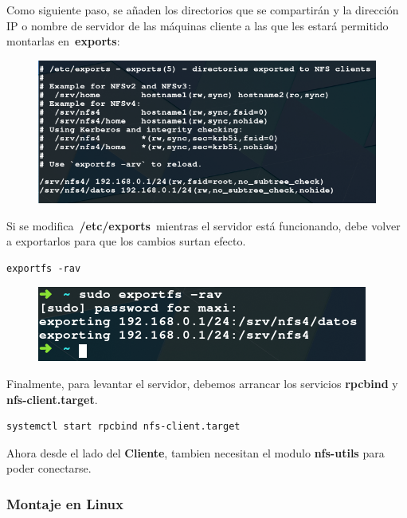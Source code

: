 \documentclass[12pt]{extarticle}
\begin{document}
Como siguiente paso, se añaden los directorios que se compartirán y la
dirección IP o nombre de servidor de las máquinas cliente a las que les
estará permitido montarlas en~\textbf{exports}:

\begin{figure}
\centering
\includegraphics{images/exports.png}
\caption{}
\end{figure}

Si se modifica~\textbf{/etc/exports}~mientras el servidor está
funcionando, debe volver a exportarlos para que los cambios surtan
efecto.

\begin{verbatim}
exportfs -rav
\end{verbatim}

\begin{figure}
\centering
\includegraphics{images/exportfs.png}
\caption{}
\end{figure}

Finalmente, para levantar el servidor, debemos arrancar los servicios
\textbf{rpcbind} y \textbf{nfs-client.target}.

\begin{verbatim}
systemctl start rpcbind nfs-client.target
\end{verbatim}

Ahora desde el lado del \textbf{Cliente}, tambien necesitan el modulo
\textbf{nfs-utils} para poder conectarse.

\subsubsection{Montaje en Linux}\label{montaje-en-linux}
\end{document}
